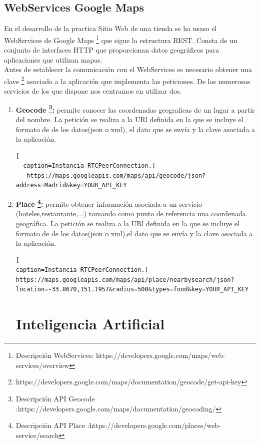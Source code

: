\subsection{WebServices Google Maps}
En el desarrollo de la practica Sitio Web de una tienda se ha usaso el WebServices de Google Maps \footnote{Descripción WebServices: https://developers.google.com/maps/web-services/overview} que sigue la estructura REST. Consta de un conjunto de interfaces HTTP que proporcionan datos geográficos para aplicaciones que utilizan mapas.
\\Antes de establecer la comunicación con el WebServices es necesario obtener una clave \footnote{https://developers.google.com/maps/documentation/geocode/get-api-key} asociado a la aplicación que implementa las peticiones. De los numerosos servicios de los que dispone nos centramos en utilizar dos.
\begin{enumerate}
\item \textbf{Geocode \footnote{Descripción API Geocode :https://developers.google.com/maps/documentation/geocoding/}:} permite conocer las coordenadas geograficas de un lugar a partir del nombre. La petición se realiza a la URl definida  en la que se incluye el formato de de los datos(json o xml), el dato que se envía y la clave asociada a la aplicación.
  \begin{lstlisting}[
  caption=Instancia RTCPeerConnection.]
   https://maps.googleapis.com/maps/api/geocode/json?address=Madrid&key=YOUR_API_KEY
  \end{lstlisting}
 \item \textbf{Place \footnote{Descripción API Place :https://developers.google.com/places/web-service/search}:} permite obtener información asociada a un servicio (hoteles,restaurante,...) tomando como punto de referencia una coordenada geográfica. La petición se realiza a la URl definida en la que se incluye el formato de de los datos(json o xml),el dato que se envía y la clave asociada a la aplicación.
\begin{lstlisting}[
caption=Instancia RTCPeerConnection.]
https://maps.googleapis.com/maps/api/place/nearbysearch/json?location=-33.8670,151.1957&radius=500&types=food&key=YOUR_API_KEY
\end{lstlisting}
\section{Inteligencia Artificial}
\end{enumerate} 